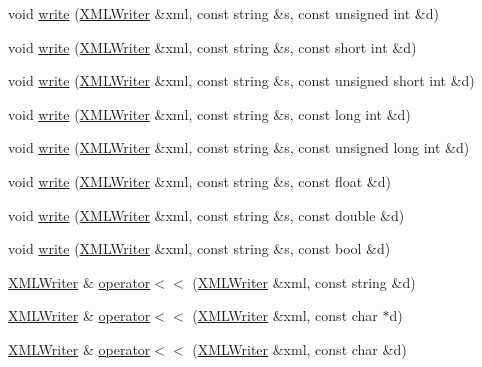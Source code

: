 \begin{DoxyCompactItemize}
\item 
void \mbox{\hyperlink{namespaceADATXML_ae74cc956dd05ca6f00fc514974a9e910}{write}} (\mbox{\hyperlink{classADATXML_1_1XMLWriter}{X\+M\+L\+Writer}} \&xml, const string \&s, const unsigned int \&d)
\item 
void \mbox{\hyperlink{namespaceADATXML_a4c9ae91c2edf209b107c441d5b61b737}{write}} (\mbox{\hyperlink{classADATXML_1_1XMLWriter}{X\+M\+L\+Writer}} \&xml, const string \&s, const short int \&d)
\item 
void \mbox{\hyperlink{namespaceADATXML_aec4f1998ac8b46117a53c900880970b5}{write}} (\mbox{\hyperlink{classADATXML_1_1XMLWriter}{X\+M\+L\+Writer}} \&xml, const string \&s, const unsigned short int \&d)
\item 
void \mbox{\hyperlink{namespaceADATXML_ad3215354aef6061e9896556e834f89bd}{write}} (\mbox{\hyperlink{classADATXML_1_1XMLWriter}{X\+M\+L\+Writer}} \&xml, const string \&s, const long int \&d)
\item 
void \mbox{\hyperlink{namespaceADATXML_a578f900bd955ac5e0634cab05b971100}{write}} (\mbox{\hyperlink{classADATXML_1_1XMLWriter}{X\+M\+L\+Writer}} \&xml, const string \&s, const unsigned long int \&d)
\item 
void \mbox{\hyperlink{namespaceADATXML_a035a5eef9aec1745474937a355e7813b}{write}} (\mbox{\hyperlink{classADATXML_1_1XMLWriter}{X\+M\+L\+Writer}} \&xml, const string \&s, const float \&d)
\item 
void \mbox{\hyperlink{namespaceADATXML_a858880833c586f87f16f2f3022243c16}{write}} (\mbox{\hyperlink{classADATXML_1_1XMLWriter}{X\+M\+L\+Writer}} \&xml, const string \&s, const double \&d)
\item 
void \mbox{\hyperlink{namespaceADATXML_af41b23f17b1b37465f4c3ca3a115e87a}{write}} (\mbox{\hyperlink{classADATXML_1_1XMLWriter}{X\+M\+L\+Writer}} \&xml, const string \&s, const bool \&d)
\item 
\mbox{\hyperlink{classADATXML_1_1XMLWriter}{X\+M\+L\+Writer}} \& \mbox{\hyperlink{namespaceADATXML_a5588aaaf70ed009fbd91977db5399dd1}{operator$<$$<$}} (\mbox{\hyperlink{classADATXML_1_1XMLWriter}{X\+M\+L\+Writer}} \&xml, const string \&d)
\item 
\mbox{\hyperlink{classADATXML_1_1XMLWriter}{X\+M\+L\+Writer}} \& \mbox{\hyperlink{group__io_ga1e77b0f38cdffd40d5f5d947a4527bb4}{operator$<$$<$}} (\mbox{\hyperlink{classADATXML_1_1XMLWriter}{X\+M\+L\+Writer}} \&xml, const char $\ast$d)
\item 
\mbox{\hyperlink{classADATXML_1_1XMLWriter}{X\+M\+L\+Writer}} \& \mbox{\hyperlink{group__io_gaaf7119c0afc1e8701f12daa5d349ae00}{operator$<$$<$}} (\mbox{\hyperlink{classADATXML_1_1XMLWriter}{X\+M\+L\+Writer}} \&xml, const char \&d)

\end{DoxyCompactItemize}

